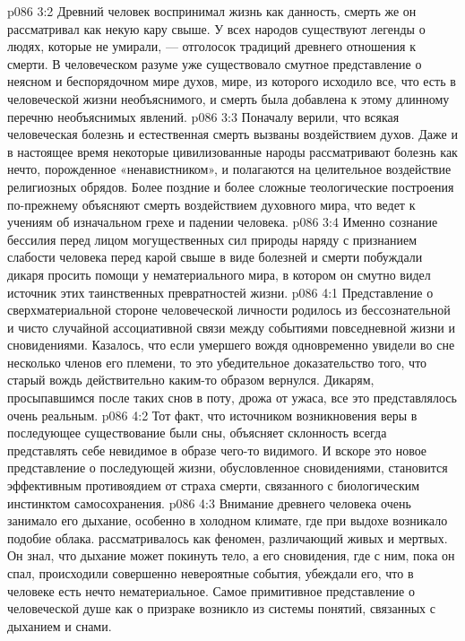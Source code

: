 \vs p086 3:2 \pc Древний человек воспринимал жизнь как данность, смерть же он рассматривал как некую кару свыше. У всех народов существуют легенды о людях, которые не умирали, --- отголосок традиций древнего отношения к смерти. В человеческом разуме уже существовало смутное представление о неясном и беспорядочном мире духов, мире, из которого исходило все, что есть в человеческой жизни необъяснимого, и смерть была добавлена к этому длинному перечню необъяснимых явлений.
\vs p086 3:3 Поначалу верили, что всякая человеческая болезнь и естественная смерть вызваны воздействием духов. Даже и в настоящее время некоторые цивилизованные народы рассматривают болезнь как нечто, порожденное «ненавистником», и полагаются на целительное воздействие религиозных обрядов. Более поздние и более сложные теологические построения по\hyp{}прежнему объясняют смерть воздействием духовного мира, что ведет к учениям об изначальном грехе и падении человека.
\vs p086 3:4 Именно сознание бессилия перед лицом могущественных сил природы наряду с признанием слабости человека перед карой свыше в виде болезней и смерти побуждали дикаря просить помощи у нематериального мира, в котором он смутно видел источник этих таинственных превратностей жизни.
\vs p086 4:1 Представление о сверхматериальной стороне человеческой личности родилось из бессознательной и чисто случайной ассоциативной связи между событиями повседневной жизни и сновидениями. Казалось, что если умершего вождя одновременно увидели во сне несколько членов его племени, то это убедительное доказательство того, что старый вождь действительно каким\hyp{}то образом вернулся. Дикарям, просыпавшимся после таких снов в поту, дрожа от ужаса, все это представлялось очень реальным.
\vs p086 4:2 Тот факт, что источником возникновения веры в последующее существование были сны, объясняет склонность всегда представлять себе невидимое в образе чего\hyp{}то видимого. И вскоре это новое представление о последующей жизни, обусловленное сновидениями, становится эффективным противоядием от страха смерти, связанного с биологическим инстинктом самосохранения.
\vs p086 4:3 Внимание древнего человека очень занимало его дыхание, особенно в холодном климате, где при выдохе возникало подобие облака.  рассматривалось как феномен, различающий живых и мертвых. Он знал, что дыхание может покинуть тело, а его сновидения, где с ним, пока он спал, происходили совершенно невероятные события, убеждали его, что в человеке есть нечто нематериальное. Самое примитивное представление о человеческой душе как о призраке возникло из системы понятий, связанных с дыханием и снами.
